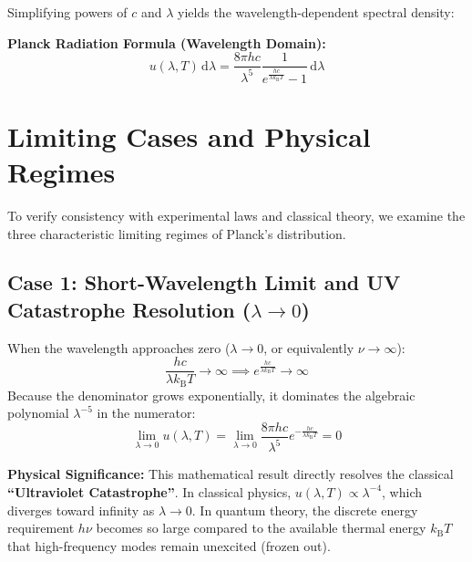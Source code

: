 \documentclass[11pt,a4paper]{article}
\newcommand{\diff}{\mathrm{d}}
\newcommand{\kB}{k_{\mathrm{B}}}
\begin{document}
Simplifying powers of $c$ and $\lambda$ yields the wavelength-dependent spectral density:

\begin{resultbox}
\textbf{Planck Radiation Formula (Wavelength Domain):}
\begin{equation}
    \boxed{u(\lambda, T)\,\diff\lambda = \frac{8\pi h c}{\lambda^5} \frac{1}{e^{\frac{hc}{\lambda \kB T}} - 1} \,\diff\lambda} \tag{VI}
\end{equation}
\end{resultbox}

\section{Limiting Cases and Physical Regimes}

To verify consistency with experimental laws and classical theory, we examine the three characteristic limiting regimes of Planck's distribution.

\subsection{Case 1: Short-Wavelength Limit and UV Catastrophe Resolution (\texorpdfstring{$\lambda \to 0$}{lambda -> 0})}
When the wavelength approaches zero ($\lambda \to 0$, or equivalently $\nu \to \infty$):
\begin{equation}
    \frac{hc}{\lambda \kB T} \to \infty \implies e^{\frac{hc}{\lambda \kB T}} \to \infty
\end{equation}
Because the denominator grows exponentially, it dominates the algebraic polynomial $\lambda^{-5}$ in the numerator:
\begin{equation}
    \lim_{\lambda \to 0} u(\lambda, T) = \lim_{\lambda \to 0} \frac{8\pi hc}{\lambda^5} e^{-\frac{hc}{\lambda \kB T}} = 0
\end{equation}
\begin{postulatebox}
\textbf{Physical Significance:} 
This mathematical result directly resolves the classical \textbf{``Ultraviolet Catastrophe''}. In classical physics, $u(\lambda, T) \propto \lambda^{-4}$, which diverges toward infinity as $\lambda \to 0$. In quantum theory, the discrete energy requirement $h\nu$ becomes so large compared to the available thermal energy $\kB T$ that high-frequency modes remain unexcited (frozen out).
\end{postulatebox}
\end{document}
